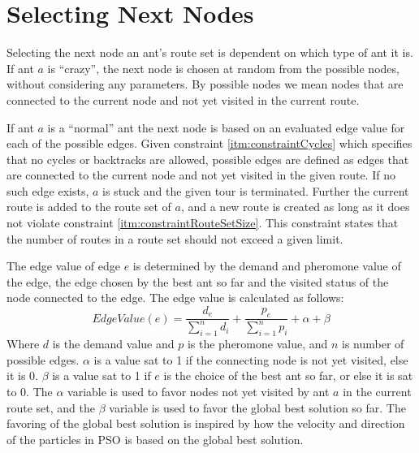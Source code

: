 \section{Selecting Next Nodes}
\label{sec:selectingNextNode}

Selecting the next node an ant's route set is dependent on which type of ant it is. If ant $a$ is ``crazy'', the next node is chosen at random from the possible nodes, without considering any parameters. By possible nodes we mean nodes that are connected to the current node and not yet visited in the current route.

If ant $a$ is a ``normal'' ant the next node is based on an evaluated edge value for each of the possible edges. Given constraint \vref{itm:constraintCycles} which specifies that no cycles or backtracks are allowed, possible edges are defined as edges that are connected to the current node and not yet visited in the given route. If no such edge exists, $a$ is stuck and the given tour is terminated. Further the current route is added to the route set of $a$, and a new route is created as long as it does not violate constraint \vref{itm:constraintRouteSetSize}. This constraint states that the number of routes in a route set should not exceed a given limit. 

The edge value of edge $e$ is determined by the demand and pheromone value of the edge, the edge chosen by the best ant so far and the visited status of the node connected to the edge. The edge value is calculated as follows: 
\newline
$$EdgeValue(e) = \frac{d_e}{\sum\limits^{n}_{i=1}d_i} + \frac{p_e}{\sum\limits^{n}_{i=1}p_i} + \alpha + \beta$$
\newline
Where $d$ is the demand value and $p$ is the pheromone value, and $n$ is number of possible edges. $\alpha$ is a value sat to 1 if the connecting node is not yet visited, else it is 0. $\beta$ is a value sat to 1 if $e$ is the choice of the best ant so far, or else it is sat to 0. The $\alpha$ variable is used to favor nodes not yet visited by ant $a$ in the current route set, and the $\beta$ variable is used to favor the global best solution so far. The favoring of the global best solution is inspired by how the velocity and direction of the particles in PSO is based on the global best solution. 


